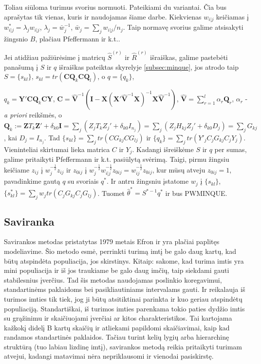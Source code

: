 \documentclass[12pt,a4paper]{article}
\begin{document}
\indent Toliau siūloma turimus svorius normuoti. Pateikiami du variantai. Čia bus aprašytas tik vienas, kuris ir naudojamas šiame darbe.  Kiekvienas $w_{i|j}$ keičiamas į $w_{i|j}^*=\lambda_jw_{i|j}$, $\lambda_j=\bar{w}_j^{-1}$, $\bar{w}_j=\sum_jw_{i|j}/n_j$. Taip normavę svorius galime atsisakyti žingsnio $B$, plačiau Pfeffermann ir k.t.\cite{pfeff}.

\indent Jei atidžiau pažiūrėsime į matricų $\hat{S}^{(r)}$ ir $\hat{R}^{(r)}$ išraiškas, galime pastebėti panašumą į $S$ ir $q$ išraiškas pateiktas skyrelyje \ref{subsec:minque}, jos atrodo taip $S=\{s_{kl}\}$, $s_{kl}=tr(\mathbf{CQ}_k\mathbf{CQ}_l)$, o
$q=\{q_k\}$,

\noindent $q_k=\mathbf{Y'CQ}_k\mathbf{CY}$, $\mathbf{C} = \mathbf{\hat{V}}^{-1}\left(\mathbf{I}-\mathbf{X}\left(\mathbf{X' \hat{V}}^{-1}\mathbf{X}\right)^{-1}\mathbf{X \hat{V}}^{-1}\right)$, $\mathbf{\hat{V}}=\sum^l_{r=1}\alpha_r\mathbf{Q}_r$, $\alpha_r$ - \textit{a priori} reikšmės, o $\mathbf{Q}_k:= \mathbf{Z}T_k\mathbf{Z'}+\delta_{k0}\mathbf{I}=\sum_j(Z_jT_kZ_j'+\delta_{k0}I_{n_j})=\sum_j(Z_jH_{kj}Z_j'+\delta_{k0}D_j)=\sum_jG_{kj}$, kai $D_j=I_{n_j}$. Tad $\{s_{kl}\}=\sum_jtr(CG_{kj}CG_{lj})$ ir $\{q_k\}=\sum_jtr(Y'_jC_jG_{kj}C_jY_j)$. Vieninteliai skirtumai lieka matrica $C$ ir $Y_j$. Kadangi išreiškėme $S$ ir $q$ per sumas, galime pritaikyti  Pfeffermann ir k.t.\cite{pfeff} pasiūlytą svėrimą. Taigi, pirmu žingsiu keičiame $z_{ij}$ į $w_j^{-\frac{1}{2}}z_{ij}$ ir $z_{0ij}$ į $w_j^{-\frac{1}{2}}w_{i|j}^{-\frac{1}{2}}z_{0ij}=w_{ij}^{-\frac{1}{2}}z_{0ij}$, kur mūsų atveju $z_{0ij}=1$, pavadinkime gautą $q$ su svoriais $q^*$. Ir antru žingsniu įstatome $w_j$ į $\{s_{kl}\}$, $\{s^*_{kl}\}=\sum_jw_jtr(C_jG_{kj}C_jG_{lj})$. Tuomet $\hat{\theta}^*=S^{*-1}q^*$ ir bus PWMINQUE.

\subsection{Saviranka}

\indent Savirankos metodas pristatytas 1979 metais Efron \cite{efron} ir yra plačiai paplitęs modeliavime. Šio metodo esmė, perrinkti turimą imtį be galo daug kartų, kad būtų atspindėta populiacija, jos skirstinys. Kitaip: sakome, kad turima imtis yra mini populiacija ir iš jos traukiame be galo daug imčių, taip siekdami gauti stabilesnius įverčius. Tad šis metodas naudojamas poslinkio koregavimui, standartinėms paklaidoms bei pasikliautiniams intervalams gauti. Ir reikalauja iš turimos imties tik tiek, jog ji būtų atsitiktinai parinkta ir kuo geriau atspindėtų populiaciją. Standartiškai, iš turimos imties parenkama tokio paties dydžio imtis su grąžinimu ir skaičiuojami įverčiai ar kitos charakteristikos. Tai kartojama kažkokį didelį B kartų skaičių ir atliekami papildomi skaičiavimai, kaip kad randamos standartinės paklaidos. Tačiau turint kelių lygių arba hierarchinę struktūrą (tuo labiau lizdinę imtį), savirankos metodą reikia pritaikyti turimam atvejui, kadangi matavimai nėra nepriklausomi ir vienodai pasiskirstę.
\end{document}
